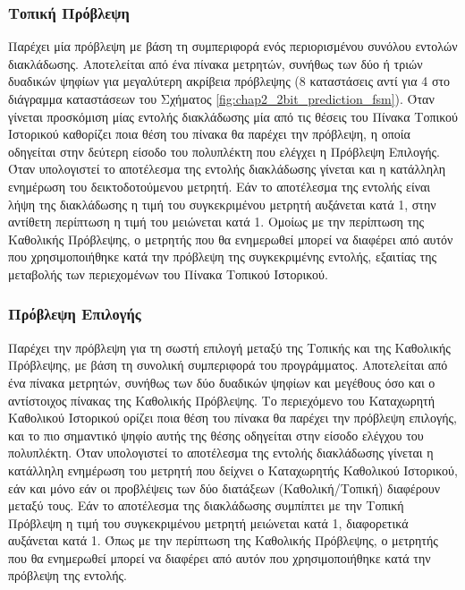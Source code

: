 \subsubsection*{Τοπική Πρόβλεψη}
\label{chap2_LocalPrediction}

Παρέχει μία πρόβλεψη με βάση τη συμπεριφορά ενός περιορισμένου συνόλου εντολών διακλάδωσης. Αποτελείται από ένα πίνακα μετρητών, συνήθως των δύο ή τριών δυαδικών ψηφίων για μεγαλύτερη ακρίβεια πρόβλεψης (8 καταστάσεις αντί για 4 στο διάγραμμα καταστάσεων του Σχήματος \ref{fig:chap2_2bit_prediction_fsm}). Όταν γίνεται προσκόμιση μίας εντολής διακλάδωσης μία από τις θέσεις του Πίνακα Τοπικού Ιστορικού καθορίζει ποια θέση του πίνακα θα παρέχει την πρόβλεψη, η οποία οδηγείται στην δεύτερη είσοδο του πολυπλέκτη που ελέγχει η Πρόβλεψη Επιλογής. Όταν υπολογιστεί το αποτέλεσμα της εντολής διακλάδωσης γίνεται και η κατάλληλη ενημέρωση του δεικτοδοτούμενου μετρητή. Εάν το αποτέλεσμα της εντολής είναι λήψη της διακλάδωσης η τιμή του συγκεκριμένου μετρητή αυξάνεται κατά 1, στην αντίθετη περίπτωση η τιμή του μειώνεται κατά 1. Ομοίως με την περίπτωση της Καθολικής Πρόβλεψης, ο μετρητής που θα ενημερωθεί μπορεί να διαφέρει από αυτόν που χρησιμοποιήθηκε κατά την πρόβλεψη της συγκεκριμένης εντολής, εξαιτίας της μεταβολής των περιεχομένων του Πίνακα Τοπικού Ιστορικού.

\subsubsection*{Πρόβλεψη Επιλογής}
\label{chap2_ChoicePrediction}

Παρέχει την πρόβλεψη για τη σωστή επιλογή μεταξύ της Τοπικής και της Καθολικής Πρόβλεψης, με βάση τη συνολική συμπεριφορά του προγράμματος. Αποτελείται από ένα πίνακα μετρητών, συνήθως των δύο δυαδικών ψηφίων και μεγέθους όσο και ο αντίστοιχος πίνακας της Καθολικής Πρόβλεψης. Το περιεχόμενο του Καταχωρητή Καθολικού Ιστορικού ορίζει ποια θέση του πίνακα θα παρέχει την πρόβλεψη επιλογής, και το πιο σημαντικό ψηφίο αυτής της θέσης οδηγείται στην είσοδο ελέγχου του πολυπλέκτη. Όταν υπολογιστεί το αποτέλεσμα της εντολής διακλάδωσης γίνεται η κατάλληλη ενημέρωση του μετρητή που δείχνει ο Καταχωρητής Καθολικού Ιστορικού, εάν και μόνο εάν οι προβλέψεις των δύο διατάξεων (Καθολική/Τοπική) διαφέρουν μεταξύ τους. Εάν το αποτέλεσμα της διακλάδωσης συμπίπτει με την Τοπική Πρόβλεψη η τιμή του συγκεκριμένου μετρητή μειώνεται κατά 1, διαφορετικά αυξάνεται κατά 1. Όπως με την περίπτωση της Καθολικής Πρόβλεψης, ο μετρητής που θα ενημερωθεί μπορεί να διαφέρει από αυτόν που χρησιμοποιήθηκε κατά την πρόβλεψη της εντολής.


